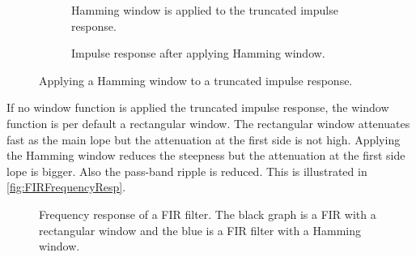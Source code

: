 \begin{figure}[H]
\centering
\begin{subfigure}[t]{0.45\textwidth}
    \centering
    
    \caption{Hamming window is applied to the truncated impulse response.}
    \label{fig:FIRTruncation}
\end{subfigure}
\begin{subfigure}[t]{0.45\textwidth}
    \centering
    
    \caption{Impulse response after applying Hamming window.}
    \label{fig:FIRHamming}
\end{subfigure}
\caption{Applying a Hamming window to a truncated impulse response.}
\label{fig:FIRWindow}
\end{figure} 

If no window function is applied the truncated impulse response, the window function is per default a rectangular window. The rectangular window attenuates fast as the main lope but the attenuation at the first side is not high. Applying the Hamming window reduces the steepness but the attenuation at the first side lope is bigger. Also the pass-band ripple is reduced. This is illustrated in \autoref{fig:FIRFrequencyResp}.

\begin{figure}[H]
    \centering
    
    \caption{Frequency response of a FIR filter. The black graph is a FIR with a rectangular window and the blue is a FIR filter with a Hamming window.}
\label{fig:FIRFrequencyResp}
\end{figure}  

